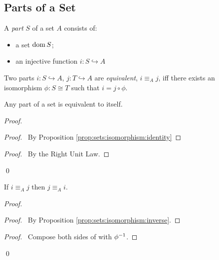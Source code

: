 \subsection{Parts of a Set}

\begin{df}[Part]
  A \emph{part} $S$ of a set $A$ consists of:
  \begin{itemize}
   \item a set $\operatorname{dom} S$;
   \item an injective function $i : S \hookrightarrow A$
  \end{itemize}
\end{df}

\begin{df}
  Two parts $i : S \hookrightarrow A$, $j : T \hookrightarrow A$ are
  \emph{equivalent}, $i \equiv_A j$, iff there exists an isomorphism $\phi :
S \cong T$ such that $i = j \circ \phi$.
\end{df}

\begin{prop}
 Any part of a set is equivalent to itself.
\end{prop}

\begin{proof}
 \pf
 \begin{proof}
   \pf\ By Proposition \ref{prop:sets:isomorphism:identity}
 \end{proof}
 \begin{proof}
   \pf\ By the Right Unit Law.
 \end{proof}
 \qed
\end{proof}

\begin{prop}
 If $i \equiv_A j$ then $j \equiv_A i$.
\end{prop}

\begin{proof}
 \pf
 \begin{proof}
   \pf\ By Proposition \ref{prop:sets:isomorphism:inverse}.
 \end{proof}
 \begin{proof}
   \pf\ Compose both sides of  with ${\phi}^{-1}$.
 \end{proof}
 \qed
\end{proof}

